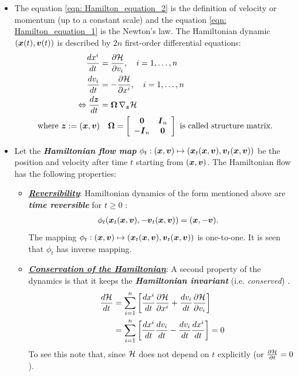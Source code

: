 \documentclass[11pt]{article}
\begin{document}
\begin{itemize}
\item The equation \eqref{eqn: Hamilton_equation_2} is the definition of velocity or momentum (up to a constant scale) and the equation \eqref{eqn: Hamilton_equation_1} is the Newton's law. The Hamiltonian dynamic $(\boldsymbol{x}(t), \boldsymbol{v}(t))$ is described by $2n$ first-order differential equations:
\begin{align}
\frac{d x^{i}}{dt} &=  \frac{\partial {\mathcal H}}{ \partial v_{i}}, \quad  i=1,\ldots, n \nonumber\\
\frac{d v_{i}}{dt} &= - \frac{\partial {\mathcal H}}{ \partial x^{i}}, \quad  i=1,\ldots, n \label{eqn: Hamilton_dynamics_general} \\
\Leftrightarrow \frac{d\boldsymbol{z}}{dt} &= \boldsymbol{\Omega}\,\nabla_{\boldsymbol{z}}{{\mathcal H}} \label{eqn: Hamilton_dynamics_general_combine}\\
\text{where }\boldsymbol{z}:= (\boldsymbol{x}, \boldsymbol{v})&\quad \boldsymbol{\Omega} = \left[\begin{array}{cc}
\boldsymbol{0} & \boldsymbol{I}_{n}  \\
-\boldsymbol{I}_{n}  & \boldsymbol{0}  
\end{array}\right]\text{ is called structure matrix}. \label{eqn: Hamilton_dynamics_structure_mat}
\end{align}

\item Let the \emph{\textbf{Hamiltonian flow map}} $\phi_t : (\boldsymbol{x}, \boldsymbol{v}) \mapsto (\boldsymbol{x}_t(\boldsymbol{x}, \boldsymbol{v}), \boldsymbol{v}_t(\boldsymbol{x}, \boldsymbol{v}))$ be the position and velocity after time $t$ starting from $(\boldsymbol{x}, \boldsymbol{v})$.  The Hamiltonian flow has the following properties:
\begin{itemize}
\item \underline{\emph{\textbf{Reversibility}}}: Hamiltonian dynamics of the form mentioned above are \emph{\textbf{time reversible}} for $t \ge 0$ \citep{brooks2011handbook}:
\begin{align}
\phi_t(\boldsymbol{x}_t(\boldsymbol{x}, \boldsymbol{v}), -\boldsymbol{v}_t(\boldsymbol{x}, \boldsymbol{v})) &= (\boldsymbol{x}, -\boldsymbol{v}). \label{eqn: Hamiltonian_reverse}
\end{align} The mapping $\phi_t : (\boldsymbol{x}, \boldsymbol{v}) \mapsto (\boldsymbol{x}_t(\boldsymbol{x}, \boldsymbol{v}), \boldsymbol{v}_t(\boldsymbol{x}, \boldsymbol{v}))$ is one-to-one. It is seen that $\phi_t$ has inverse mapping.

\item  \underline{\emph{\textbf{Conservation of the Hamiltonian}}}: A second property of the dynamics is that it keeps the \emph{\textbf{Hamiltonian invariant}} (i.e. \emph{conserved}) \citep{brooks2011handbook}.
\begin{align}
\frac{d{\mathcal H}}{dt} &= \sum_{i=1}^{n}\left[\frac{d x^{i}}{dt}\frac{\partial {\mathcal H}}{ \partial x^{i}} + \frac{d v_i}{dt}\frac{\partial {\mathcal H}}{ \partial v_{i}} \right] \nonumber\\
&= \sum_{i=1}^{n}\left[\frac{d x^{i}}{dt} \frac{d v_i}{dt} - \frac{d v_i}{dt}\frac{d x^{i}}{dt} \right]  = 0   \label{eqn: Hamiltonian_conserve}
\end{align} To see this note that, since ${\mathcal H}$ does not depend on $t$ explicitly (or $\frac{\partial {\mathcal H}}{ \partial t} = 0$).


\end{itemize}
\end{itemize}
\end{document}
